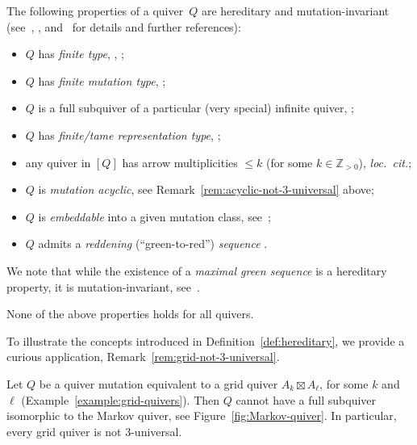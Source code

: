 \documentclass[ALCO,ThmDefs,Unicode,epreuves,published]{cedram}
\newcommand{\ZZ}{{\mathbb{Z}}}
\begin{document}
\begin{example}
The following properties of a quiver~$Q$ are hereditary and mutation-invariant (see~\cite[Section~4.1]{FWZ}, \cite[Section~5.2]{keller-survey}, and~\cite[Section~3]{muller-max-green} for details and further references): 
\begin{itemize}%
\item 
$Q$ has \emph{finite type}, \cf \cite{ca2}, \cite[Remark~5.10.9]{FWZ}; %
\item 
$Q$ has \emph{finite mutation type}, \cf \cite[Proposition~4.1.4]{FWZ}; 
\item
$Q$ is a full subquiver of a particular (very special) infinite quiver, \cf \eg \cite{Henrich}; 
\item 
$Q$ has \emph{finite/tame representation type}, \cf \cite[Theorem~5.5]{keller-survey}; 
\item
any quiver in $[Q]$ has arrow multiplicities $\le k$ (for some $k\in\ZZ_{>0}$), \cf \emph{loc.\ cit.}; 
\item 
$Q$ is \emph{mutation acyclic}, see Remark~\ref{rem:acyclic-not-3-universal} above; 
\item
$Q$ is \emph{embeddable} into a given mutation class, see~\cite[Definition~4.1.8]{FWZ}; %
\item 
$Q$ admits a \emph{reddening} (``green-to-red'') \emph{sequence} 
\cite[Theorem~17, Corollary~19]{muller-max-green}. 
\end{itemize}
We note that while the existence of a \emph{maximal green sequence} is a hereditary property, it is  mutation-invariant, see~\cite[Theorem~9, Corollary~14]{muller-max-green}. 

None of the above properties holds for all quivers. 
\end{example}

To illustrate the concepts introduced in Definition~\ref{def:hereditary}, 
we provide a curious application, \cf Remark~\ref{rem:grid-not-3-universal}. 

\begin{proposition}
\label{prop:grid-no-markov}
Let $Q$ be a quiver mutation equivalent to a grid quiver $A_k\boxtimes A_\ell$, for some $k$ and~$\ell$ (\cf Example~\ref{example:grid-quivers}). Then $Q$ cannot have a full subquiver isomorphic to the Markov quiver, see Figure~\ref{fig:Markov-quiver}. In particular, every grid quiver is not $3$-universal. 
\end{proposition}
\end{document}
